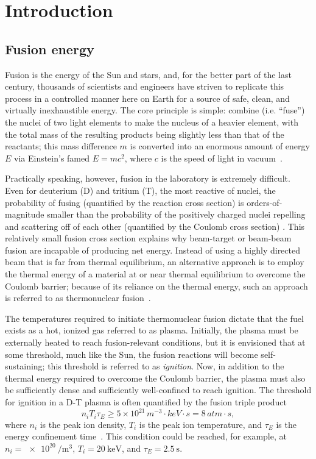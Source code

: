 \chapter{Introduction}
\label{ch:Introduction}


\section{Fusion energy}
Fusion is the energy of the Sun and stars, and,
for the better part of the last century,
thousands of scientists and engineers have striven
to replicate this process in a controlled manner here on Earth
for a source of safe, clean, and virtually inexhaustible energy.
The core principle is simple:
combine (i.e. ``fuse'') the nuclei of two light elements
to make the nucleus of a heavier element,
with the total mass of the resulting products
being slightly less than that of the reactants;
this mass difference $m$
is converted into an enormous amount of energy $E$
via Einstein's famed $E = m c^2$, where
$c$ is the speed of light in vacuum~\cite[Ch.~14]{krane}.

Practically speaking, however, fusion in the laboratory is extremely difficult.
Even for deuterium (D) and tritium (T), the most reactive of nuclei,
the probability of fusing
(quantified by the reaction cross section)
is orders-of-magnitude smaller than
the probability of the positively charged nuclei
repelling and scattering off of each other
(quantified by the Coulomb cross section)
\cite[Sec.~9.3.4]{freidberg_fusion_energy}.
This relatively small fusion cross section explains why
beam-target or beam-beam fusion are incapable of producing net energy.
Instead of using a highly directed beam that is far from thermal equilibrium,
an alternative approach is to employ the thermal energy
of a material at or near thermal equilibrium
to overcome the Coulomb barrier;
because of its reliance on the thermal energy,
such an approach is referred to as thermonuclear fusion~\cite[Ch.~14]{krane}.

The temperatures required to initiate thermonuclear fusion
dictate that the fuel exists as a hot, ionized gas
referred to as plasma.
Initially, the plasma must be externally heated
to reach fusion-relevant conditions, but
it is envisioned that at some threshold, much like the Sun,
the fusion reactions will become self-sustaining;
this threshold is referred to as \emph{ignition}.
Now, in addition to the thermal energy
required to overcome the Coulomb barrier,
the plasma must also be sufficiently dense and
sufficiently well-confined
to reach ignition.
The threshold for ignition in a D-T plasma is often quantified
by the fusion triple product
\begin{equation}
  n_{i} T_{i} \tau_E
  \geq
  5 \times 10^{21} \, m^{-3} \cdot keV \cdot s
  =
  8 \, atm \cdot s,
  \label{eq:Introduction:fusion_triple_product}
\end{equation}
where
$n_{i}$ is the peak ion density,
$T_{i}$ is the peak ion temperature, and
$\tau_E$ is the energy confinement time~\cite[Sec.~1.1]{wesson}.
This condition could be reached, for example, at
$n_i = \SI{e20}{\per\meter\cubed}$,
$T_i = \SI{20}{\kilo\eV}$, and
$\tau_E = \SI{2.5}{\second}$.

